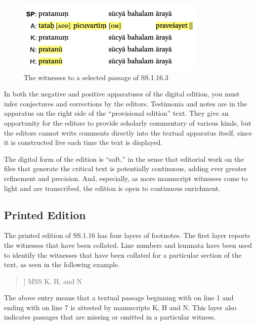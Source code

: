 \begin{figure}[h]
    \centering
    \includegraphics[draft=false,width=.7\textwidth]{media/SS.1.16b.positive}
    \caption{The witnesses to a selected passage of SS.1.16.3}
    \label{SS.1.16.3}
\end{figure}

In both the negative and positive apparatuses of the digital edition, you must
infer conjectures and corrections by the editors. Testimonia and notes are in the
apparatus on the right side of the “provisional edition” text.  They give an
opportunity for the editors to provide scholarly commentary of various kinds, but
the editors cannot write comments directly into the textual apparatus itself,
since it is constructed live each time the text is displayed.

The digital form of the edition is “soft,” in the sense that editorial work on
the files that generate the critical text is potentially continuous, adding
ever greater refinement and precision.  And, especially, as more manuscript
witnesses come to light and are transcribed, the edition is open to continuous
enrichment.

\subsection{Printed Edition}

The printed edition of SS.1.16 has four layers of footnotes. The
first layer reports the witnesses that have been collated. Line numbers and
lemmata have been used to identify the witnesses that have been collated for a
particular section of the text, as seen in the following example.
\begin{quote}
     ] MSS K, H, and N
\end{quote}
The above entry means that a textual passage beginning with  on
line 1 and ending with  on line 7 is attested by
manuscripts K, H and N. This layer also indicates passages that are missing or
omitted in a particular witness.

